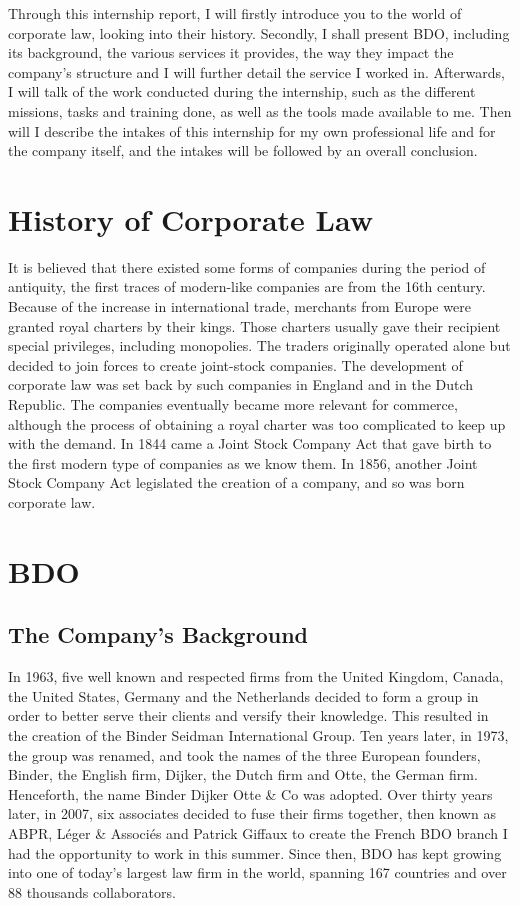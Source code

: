 \documentclass[12pt]{article}
\begin{document}
Through this internship report, I will firstly introduce you to the world of corporate law, looking into their history. Secondly, I shall present BDO, including its background, the various services it provides, the way they impact the company's structure and I will further detail the service I worked in. Afterwards, I will talk of the work conducted during the internship, such as the different missions, tasks and training done, as well as the tools made available to me. Then will I describe the intakes of this internship for my own professional life and for the company itself, and the intakes will be followed by an overall conclusion.
\clearpage

\tableofcontents
\listoffigures

\section{History of Corporate Law}

It is believed that there existed some forms of companies during the period of antiquity, the first traces of modern-like companies are from the 16th century. Because of the increase in international trade, merchants from Europe were granted royal charters by their kings. Those charters usually gave their recipient special privileges, including monopolies. The traders originally operated alone but decided to join forces to create joint-stock companies. The development of corporate law was set back by such companies in England and in the Dutch Republic. The companies eventually became more relevant for commerce, although the process of obtaining a royal charter was too complicated to keep up with the demand. In 1844 came a Joint Stock Company Act that gave birth to the first modern type of companies as we know them. In 1856, another Joint Stock Company Act legislated the creation of a company, and so was born corporate law.

\section{BDO}
\subsection{The Company's Background}

In 1963, five well known and respected firms from the United Kingdom, Canada, the United States, Germany and the Netherlands decided to form a group in order to better serve their clients and versify their knowledge. This resulted in the creation of the Binder Seidman International Group.  Ten years later, in 1973, the group was renamed, and took the names of the three European founders, Binder, the English firm, Dijker, the Dutch firm and Otte, the German firm. Henceforth, the name Binder Dijker Otte \& Co was adopted. Over thirty years later, in 2007, six associates decided to fuse their firms together, then known as ABPR, Léger \& Associés and Patrick Giffaux to create the French BDO branch I had the opportunity to work in this summer. Since then, BDO has kept growing into one of today's largest law firm in the world, spanning 167 countries and over 88 thousands collaborators.
\end{document}
